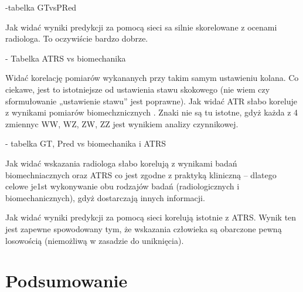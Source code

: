 -tabelka GTvsPRed

Jak widać wyniki predykcji za pomocą sieci sa silnie skorelowane z ocenami radiologa. To oczywiście bardzo dobrze. 

- Tabelka ATRS vs biomechanika

Widać  korelację  pomiarów wykananych przy takim samym ustawieniu kolana. Co ciekawe, jest to istotniejsze od ustawienia  stawu skokowego (nie wiem czy sformułowanie „ustawienie stawu” jest poprawne). Jak widać ATR słabo koreluje z wynikami pomiarów biomechznicznych . 
Znaki nie są tu istotne, gdyż każda z 4 zmiennyc WW, WZ, ZW, ZZ jest wynikiem analizy czynnikowej. 

- tabelka GT, Pred vs biomechanika i ATRS

Jak widać wskazania radiologa słabo korelują z wynikami badań biomechniacznych oraz ATRS co jest zgodne z praktyką kliniczną – dlatego celowe je1st wykonywanie obu rodzajów badań (radiologicznych i biomechanicznych), gdyż dostarczają innych informacji. 

Jak widać wyniki predykcji za pomocą sieci korelują istotnie z ATRS. Wynik ten jest zapewne spowodowany tym, że wskazania człowieka są obarczone pewną losowością (niemożliwą w zasadzie do uniknięcia). 

\chapter{Podsumowanie}




